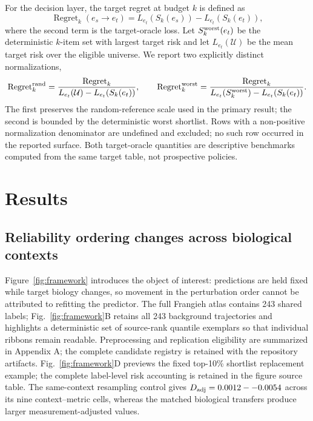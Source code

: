 \documentclass{article}
\begin{document}
For the decision layer, the target regret at budget $k$ is defined as
\begin{equation}
 \operatorname{Regret}_k(e_s\!\to e_t)=
 L_{e_t}\!\left(S_k(e_s)\right)-L_{e_t}\!\left(S_k(e_t)\right),
 \label{eq:decision_regret}
\end{equation}
where the second term is the target-oracle loss. Let
$S_k^{\rm worst}(e_t)$ be the deterministic $k$-item set with largest target
risk and let $L_{e_t}(\mathcal U)$ be the mean target risk over the eligible
universe. We report two explicitly distinct normalizations,
\begin{equation}
 \operatorname{Regret}^{\rm rand}_k=
 \frac{\operatorname{Regret}_k}{L_{e_t}(\mathcal U)-L_{e_t}(S_k(e_t))},\qquad
 \operatorname{Regret}^{\rm worst}_k=
 \frac{\operatorname{Regret}_k}{L_{e_t}(S_k^{\rm worst})-L_{e_t}(S_k(e_t))}.
 \label{eq:normalized_regret}
\end{equation}
The first preserves the random-reference scale used in the primary result;
the second is bounded by the deterministic worst shortlist. Rows with a
non-positive normalization denominator are undefined and excluded; no such row
occurred in the reported surface. Both target-oracle quantities are descriptive
benchmarks computed from the same target table, not prospective policies.

\section{Results}
\subsection{Reliability ordering changes across biological contexts}
Figure~\ref{fig:framework} introduces the object of interest: predictions are
held fixed while target biology changes, so movement in the perturbation order
cannot be attributed to refitting the predictor. The full Frangieh atlas
contains 243 shared labels; Fig.~\ref{fig:framework}B retains all 243
background trajectories and highlights a deterministic set of source-rank
quantile exemplars so that individual ribbons remain readable.
Preprocessing and replication eligibility are summarized in Appendix A; the
complete candidate registry is retained with the repository artifacts.
Fig.~\ref{fig:framework}D previews the fixed top-10\% shortlist replacement example; the complete
label-level risk accounting is retained in the figure source table. The same-context resampling
control gives $D_{\rm adj}=0.0012--0.0054$ across its nine context--metric
cells, whereas the matched biological transfers produce larger
measurement-adjusted values.
\end{document}
